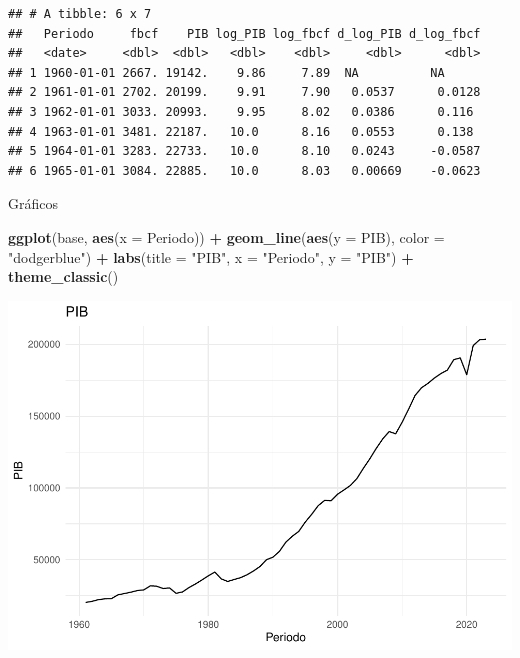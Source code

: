 \documentclass[
  12pt,
]{article}
\newenvironment{Shaded}{\begin{snugshade}}{\end{snugshade}}
\newcommand{\AttributeTok}[1]{\textcolor[rgb]{0.13,0.29,0.53}{#1}}
\newcommand{\FunctionTok}[1]{\textcolor[rgb]{0.13,0.29,0.53}{\textbf{#1}}}
\newcommand{\NormalTok}[1]{#1}
\newcommand{\SpecialCharTok}[1]{\textcolor[rgb]{0.81,0.36,0.00}{\textbf{#1}}}
\newcommand{\StringTok}[1]{\textcolor[rgb]{0.31,0.60,0.02}{#1}}
\begin{document}
\begin{verbatim}
## # A tibble: 6 x 7
##   Periodo     fbcf    PIB log_PIB log_fbcf d_log_PIB d_log_fbcf
##   <date>     <dbl>  <dbl>   <dbl>    <dbl>     <dbl>      <dbl>
## 1 1960-01-01 2667. 19142.    9.86     7.89  NA          NA     
## 2 1961-01-01 2702. 20199.    9.91     7.90   0.0537      0.0128
## 3 1962-01-01 3033. 20993.    9.95     8.02   0.0386      0.116 
## 4 1963-01-01 3481. 22187.   10.0      8.16   0.0553      0.138 
## 5 1964-01-01 3283. 22733.   10.0      8.10   0.0243     -0.0587
## 6 1965-01-01 3084. 22885.   10.0      8.03   0.00669    -0.0623
\end{verbatim}

Gráficos

\begin{Shaded}
\begin{Highlighting}[]
\FunctionTok{ggplot}\NormalTok{(base, }\FunctionTok{aes}\NormalTok{(}\AttributeTok{x =}\NormalTok{ Periodo)) }\SpecialCharTok{+}
  \FunctionTok{geom\_line}\NormalTok{(}\FunctionTok{aes}\NormalTok{(}\AttributeTok{y =}\NormalTok{ PIB), }\AttributeTok{color =} \StringTok{"dodgerblue"}\NormalTok{) }\SpecialCharTok{+}
  \FunctionTok{labs}\NormalTok{(}\AttributeTok{title =} \StringTok{"PIB"}\NormalTok{, }\AttributeTok{x =} \StringTok{"Periodo"}\NormalTok{, }\AttributeTok{y =} \StringTok{"PIB"}\NormalTok{) }\SpecialCharTok{+}
  \FunctionTok{theme\_classic}\NormalTok{()}
\end{Highlighting}
\end{Shaded}

\includegraphics{Ejercicio-4_files/figure-latex/unnamed-chunk-3-1.pdf}
\end{document}
